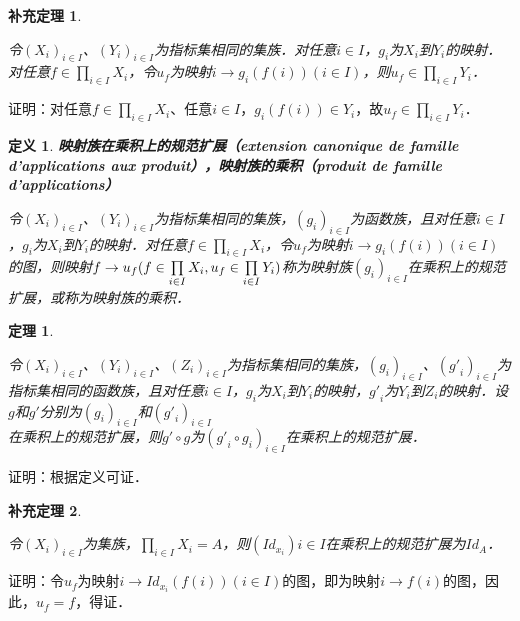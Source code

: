 \documentclass[12pt, a4paper, oneside]{book}
\newtheorem{theo}{定理}
\newtheorem{cor}{补充定理}
\newtheorem{de}{定义}
\begin{document}
			\begin{cor}\label{cor140}
				\hfill\par
				令$(X_i)_{i\in I}$、$(Y_i)_{i\in I}$为指标集相同的集族．对任意$i\in I$，$g_i$为$X_i$到$Y_i$的映射．对任意$f\in \prod\limits_{i\in I}X_i$，令$u_f$为映射$i\to g_i(f(i))(i\in I)$，则$u_f\in \prod\limits_{i\in I}Y_i$．
			\end{cor}
			证明：对任意$f\in \prod\limits_{i\in I}X_i$、任意$i\in I$，$g_i(f(i))\in Y_i$，故$u_f\in \prod\limits_{i\in I}Y_i$．
			
			\begin{de}
				\textbf{映射族在乘积上的规范扩展（extension canonique de famille d'applications aux produit），映射族的乘积（produit de famille d'applications）}
				\par
				令$(X_i)_{i\in I}$、$(Y_i)_{i\in I}$为指标集相同的集族，$(g_i)_{i\in I}$为函数族，且对任意$i\in I$，$g_i$为$X_i$到$Y_i$的映射．对任意$f\in \prod\limits_{i\in I}X_i$，令$u_f$为映射$i\to g_i(f(i))(i\in I)$的图，则映射$f\to u_f(f\in \prod\limits_{i\in I}X_i, u_f\\\in \prod\limits_{i\in I}Y_i)$称为映射族$(g_i)_{i\in I}$在乘积上的规范扩展，或称为映射族的乘积．
			\end{de}
			
			\begin{theo}\label{theo54}
				\hfill\par
				令$(X_i)_{i\in I}$、$(Y_i)_{i\in I}$、$(Z_i)_{i\in I}$为指标集相同的集族，$(g_i)_{i\in I}$、$({g'}_i)_{i\in I}$为指标集相同的函数族，且对任意$i\in I$，$g_i$为$X_i$到$Y_i$的映射，${g'}_i$为$Y_i$到$Z_i$的映射．设$g$和$g'$分别为$(g_i)_{i\in I}$和$({g'}_i)_{i\in I}$\\在乘积上的规范扩展，则$g'\circ g$为$({g'}_i\circ g_i)_{i\in I}$在乘积上的规范扩展．
			\end{theo}
			证明：根据定义可证．
			
			\begin{cor}\label{cor141}
				\hfill\par
				令$(X_i)_{i\in I}$为集族，$\prod\limits_{i\in I}X_i=A$，则$(Id_{x_i}){i\in I}$在乘积上的规范扩展为$Id_A$．
			\end{cor}
			证明：令$u_f$为映射$i\to Id_{x_i}(f(i))(i\in I)$的图，即为映射$i\to f(i)$的图，因此，$u_f=f$，得证．
\end{document}
